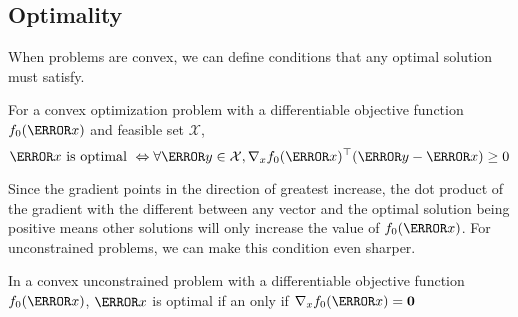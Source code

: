 \subsection{Optimality}
When problems are convex, we can define conditions that any optimal solution must satisfy.
\begin{theorem}
	For a convex optimization problem with a differentiable objective function $f_0(\V{x})$ and feasible set $\mathcal{X}$,
	\[
		\V{x} \text{ is optimal } \Leftrightarrow \forall \V{y}\in\mathcal{X}, \nabla_xf_0(\V{x})^\top(\V{y}-\V{x}) \geq 0
	\]
	\label{thm:grad-optimality}
\end{theorem}
Since the gradient points in the direction of greatest increase, the dot product of the gradient with the different between any vector and the optimal solution being positive means other solutions will only increase the value of $f_0(\V{x})$. For unconstrained problems, we can make this condition even sharper.
\begin{theorem}
	In a convex unconstrained problem with a differentiable objective function $f_0(\V{x})$, $\V{x}$ is optimal if an only if $\nabla_xf_0(\V{x}) = \bs{0}$
	\label{thm:unconst-grad-optimality}
\end{theorem}
